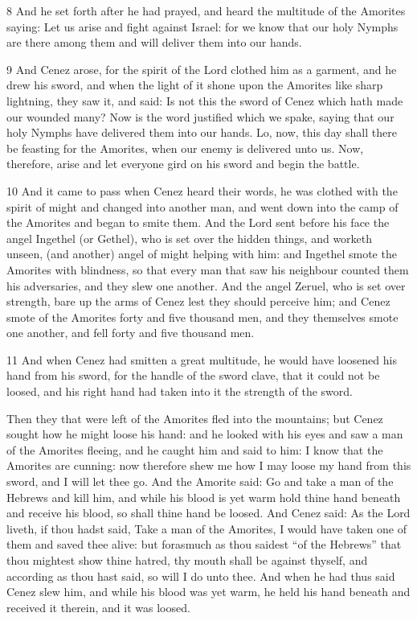 \par 8 And he set forth after he had prayed, and heard the multitude of the Amorites saying: Let us arise and fight against Israel: for we know that our holy Nymphs are there among them and will deliver them into our hands. 

\par 9 And Cenez arose, for the spirit of the Lord clothed him as a garment, and he drew his sword, and when the light of it shone upon the Amorites like sharp lightning, they saw it, and said: Is not this the sword of Cenez which hath made our wounded many? Now is the word justified which we spake, saying that our holy Nymphs have delivered them into our hands. Lo, now, this day shall there be feasting for the Amorites, when our enemy is delivered unto us. Now, therefore, arise and let everyone gird on his sword and begin the battle.

\par 10 And it came to pass when Cenez heard their words, he was clothed with the spirit of might and changed into another man, and went down into the camp of the Amorites and began to smite them. And the Lord sent before his face the angel Ingethel (or Gethel), who is set over the hidden things, and worketh unseen, (and another) angel of might helping with him: and Ingethel smote the Amorites with blindness, so that every man that saw his neighbour counted them his adversaries, and they slew one another. And the angel Zeruel, who is set over strength, bare up the arms of Cenez lest they should perceive him; and Cenez smote of the Amorites forty and five thousand men, and they themselves smote one another, and fell forty and five thousand men. 

\par 11 And when Cenez had smitten a great multitude, he would have loosened his hand from his sword, for the handle of the sword clave, that it could not be loosed, and his right hand had taken into it the strength of the sword.

\par Then they that were left of the Amorites fled into the mountains; but Cenez sought how he might loose his hand: and he looked with his eyes and saw a man of the Amorites fleeing, and he caught him and said to him: I know that the Amorites are cunning: now therefore shew me how I may loose my hand from this sword, and I will let thee go. And the Amorite said: Go and take a man of the Hebrews and kill him, and while his blood is yet warm hold thine hand beneath and receive his blood, so shall thine hand be loosed. And Cenez said: As the Lord liveth, if thou hadst said, Take a man of the Amorites, I would have taken one of them and saved thee alive: but forasmuch as thou saidest “of the Hebrews” that thou mightest show thine hatred, thy mouth shall be against thyself, and according as thou hast said, so will I do unto thee. And when he had thus said Cenez slew him, and while his blood was yet warm, he held his hand beneath and received it therein, and it was loosed.

